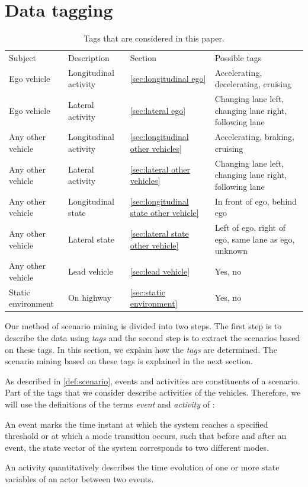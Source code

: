 \section{Data tagging}
\label{sec:tagging}

\begin{table}
	\cstarta
	\centering
	\caption{\cstarta Tags that are considered in this paper.\cenda}
	\label{tab:tags}
	\begin{tabular}{llll}
		\toprule
		Subject & Description & Section & Possible tags \\ \otoprule
		Ego vehicle & Longitudinal activity & \cref{sec:longitudinal ego} & Accelerating, decelerating, cruising \\
		Ego vehicle & Lateral activity & \cref{sec:lateral ego} & Changing lane left, changing lane right, following lane \\
		Any other vehicle & Longitudinal activity & \cref{sec:longitudinal other vehicles} & Accelerating, braking, cruising \\
		Any other vehicle & Lateral activity & \cref{sec:lateral other vehicles} & Changing lane left, changing lane right, following lane \\
		Any other vehicle & Longitudinal state & \cref{sec:longitudinal state other vehicle} & In front of ego, behind ego \\
		Any other vehicle & Lateral state & \cref{sec:lateral state other vehicle} & Left of ego, right of ego, same lane as ego, unknown \\
		Any other vehicle & Lead vehicle & \cref{sec:lead vehicle} & Yes, no \\
		Static environment & On highway & \cref{sec:static environment} & Yes, no \\ 
		\bottomrule
	\end{tabular}
	\cenda
\end{table}

\cstarta
Our method of scenario mining is divided into two steps. 
The first step is to describe the data using \emph{tags} and the second step is to extract the scenarios based on these tags. 
In this section, we explain how the \emph{tags} are determined. 
The scenario mining based on these tags is explained in the next section.

As described in \cref{def:scenario}, events and activities are constituents of a scenario. 
Part of the tags that we consider describe activities of the vehicles.
Therefore, we will use the definitions of the terms \emph{event} and \emph{activity} of \autocite{degelder2018ontology}:\cenda
\begin{definition}
	\label{def:event}
	An event marks the time instant at which the system reaches a specified threshold or at which a mode transition occurs, such that before and after an event, the state vector of the system corresponds to two different modes.
\end{definition}
\begin{definition}
	\label{def:activity}
	An activity quantitatively describes the time evolution of one or more state variables of an actor between two events.
\end{definition}

